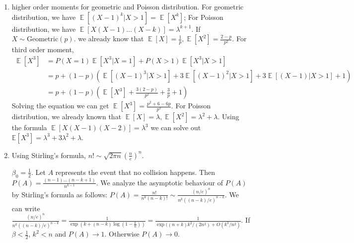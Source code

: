 \documentclass{article}
\DeclareMathOperator{\E}{\mathbb{E}}
\begin{document}
\begin{enumerate}
    \item higher order moments for geometric and Poisson
    distribution. For geometric distribution, we have
    $\E[(X-1)^k|X>1]=\E[X^k]$; For Poisson distribution,
    we have $\E[X(X-1)\dots(X-k)]=\lambda^{k+1}$.
    If $X \sim \mathrm{Geometric}(p)$. we already know that
    $\E[X]=\frac{1}{p}, \E[X^2]=\frac{2-p}{p^2}$.
    For third order moment, 
    \begin{align*}
    \E[X^3] & = P(X=1)\E[X^3|X=1]+P(X>1)\E[X^3|X>1] \\
   &= p + (1-p)(\E[(X-1)^3|X>1]+3\E[(X-1)^2|X>1]+3\E[(X-1)|X>1] + 1)\\
   &= p + (1-p)(\E[X^3]+\frac{3(2-p)}{p^2}+\frac{3}{p} + 1)
    \end{align*}
    Solving the equation we can get $\E[X^3]=\frac{p^2+6-6p}{p^3}$.
    For Poisson distribution, we already known that $\E[X]=\lambda, \E[X^2]=\lambda^2+\lambda$. Using the formula $\E[X(X-1)(X-2)]=\lambda^3$
    we can solve out $\mathbb{E}[X^3]=\lambda^3+3\lambda^2+\lambda$.
    
    \item Using Stirling's formula, $n! \sim \sqrt{2\pi n}(\frac{n}{e})^n$.
    
    $\beta_0=\frac{1}{2}$.
Let $A$ represents the event that no collision
happens. Then $P(A) = \frac{(n-1) \dots (n-k+1)}{n^{k-1}}$. We analyze the asymptotic behaviour of $P(A)$ by Stirling's formula as follows:
$P(A) = \frac{n!}{n^k (n-k)!} \sim \frac{(n/e)^n}{n^k ((n-k)/e)^{n-k}}$. We can write
$\frac{(n/e)^n}{n^k ((n-k)/e)^{n-k}}=\frac{1}{\exp(k+(n-k)\log(1-\frac{k}{n}))}=\frac{1}{\exp((n+k)k^2/(2n^2) + O(k^3/n^2)}$.
If $\beta < \frac{1}{2}$, $k^2 < n$ and $P(A) \to 1$.
Otherwise $P(A) \to 0$.


\end{enumerate}
\end{document}
